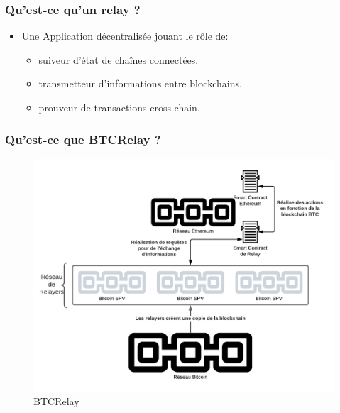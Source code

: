 \begin{frame} 
  \frametitle{Qu’est-ce qu’un relay ?} 
  \begin{itemize} 
    \item Une Application décentralisée jouant le rôle de: 
    \begin{itemize}
      \item suiveur d’état de chaînes connectées.
      \item transmetteur d’informations entre blockchains.
      \item prouveur de transactions cross-chain.
    \end{itemize}
  \end{itemize} 
\end{frame}

\begin{frame}
  \frametitle{Qu’est-ce que BTCRelay ?}
  \begin{figure}
    \centering
    \includegraphics[scale = 0.22]{decentralisation/btcRelay.png}
    \caption{BTCRelay}
  \end{figure}
\end{frame}



